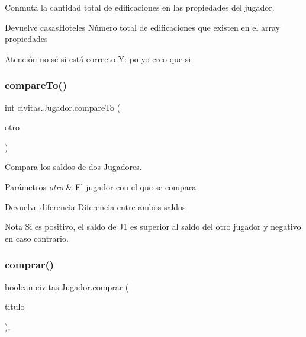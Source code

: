 Conmuta la cantidad total de edificaciones en las propiedades del jugador. \begin{DoxyReturn}{Devuelve}
casas\+Hoteles Número total de edificaciones que existen en el array propiedades 
\end{DoxyReturn}
\begin{DoxyWarning}{Atención}
no sé si está correcto Y\+: po yo creo que si 
\end{DoxyWarning}
\mbox{\label{classcivitas_1_1Jugador_ad18fdf2b46d7146b458a77a919d66b58}} 
\subsubsection{\texorpdfstring{compare\+To()}{compareTo()}}
{\footnotesize\ttfamily int civitas.\+Jugador.\+compare\+To (\begin{DoxyParamCaption}\item[{\hyperlink{classcivitas_1_1Jugador}{Jugador}}]{otro }\end{DoxyParamCaption})\hspace{0.3cm}{\ttfamily [inline]}}

Compara los saldos de dos Jugadores. 
\begin{DoxyParams}{Parámetros}
{\em otro} & El jugador con el que se compara \\
\hline
\end{DoxyParams}
\begin{DoxyReturn}{Devuelve}
diferencia Diferencia entre ambos saldos 
\end{DoxyReturn}
\begin{DoxyNote}{Nota}
Si es positivo, el saldo de J1 es superior al saldo del otro jugador y negativo en caso contrario. 
\end{DoxyNote}
\mbox{\label{classcivitas_1_1Jugador_a8f31f1a403355a68600c591ddf6d5418}} 
\subsubsection{\texorpdfstring{comprar()}{comprar()}}
{\footnotesize\ttfamily boolean civitas.\+Jugador.\+comprar (\begin{DoxyParamCaption}\item[{\hyperlink{classcivitas_1_1TituloPropiedad}{Titulo\+Propiedad}}]{titulo }\end{DoxyParamCaption})\hspace{0.3cm}{\ttfamily [inline]}, {\ttfamily [package]}}

